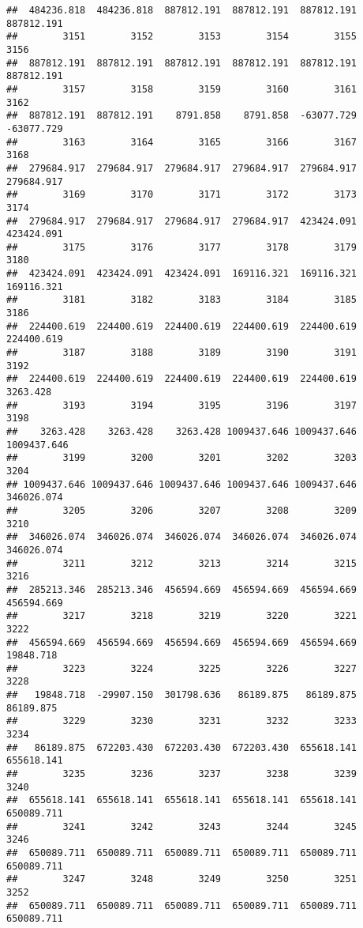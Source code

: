 \documentclass[
]{book}
\begin{document}
\begin{verbatim}
##  484236.818  484236.818  887812.191  887812.191  887812.191  887812.191 
##        3151        3152        3153        3154        3155        3156 
##  887812.191  887812.191  887812.191  887812.191  887812.191  887812.191 
##        3157        3158        3159        3160        3161        3162 
##  887812.191  887812.191    8791.858    8791.858  -63077.729  -63077.729 
##        3163        3164        3165        3166        3167        3168 
##  279684.917  279684.917  279684.917  279684.917  279684.917  279684.917 
##        3169        3170        3171        3172        3173        3174 
##  279684.917  279684.917  279684.917  279684.917  423424.091  423424.091 
##        3175        3176        3177        3178        3179        3180 
##  423424.091  423424.091  423424.091  169116.321  169116.321  169116.321 
##        3181        3182        3183        3184        3185        3186 
##  224400.619  224400.619  224400.619  224400.619  224400.619  224400.619 
##        3187        3188        3189        3190        3191        3192 
##  224400.619  224400.619  224400.619  224400.619  224400.619    3263.428 
##        3193        3194        3195        3196        3197        3198 
##    3263.428    3263.428    3263.428 1009437.646 1009437.646 1009437.646 
##        3199        3200        3201        3202        3203        3204 
## 1009437.646 1009437.646 1009437.646 1009437.646 1009437.646  346026.074 
##        3205        3206        3207        3208        3209        3210 
##  346026.074  346026.074  346026.074  346026.074  346026.074  346026.074 
##        3211        3212        3213        3214        3215        3216 
##  285213.346  285213.346  456594.669  456594.669  456594.669  456594.669 
##        3217        3218        3219        3220        3221        3222 
##  456594.669  456594.669  456594.669  456594.669  456594.669   19848.718 
##        3223        3224        3225        3226        3227        3228 
##   19848.718  -29907.150  301798.636   86189.875   86189.875   86189.875 
##        3229        3230        3231        3232        3233        3234 
##   86189.875  672203.430  672203.430  672203.430  655618.141  655618.141 
##        3235        3236        3237        3238        3239        3240 
##  655618.141  655618.141  655618.141  655618.141  655618.141  650089.711 
##        3241        3242        3243        3244        3245        3246 
##  650089.711  650089.711  650089.711  650089.711  650089.711  650089.711 
##        3247        3248        3249        3250        3251        3252 
##  650089.711  650089.711  650089.711  650089.711  650089.711  650089.711 

\end{verbatim}
\end{document}
